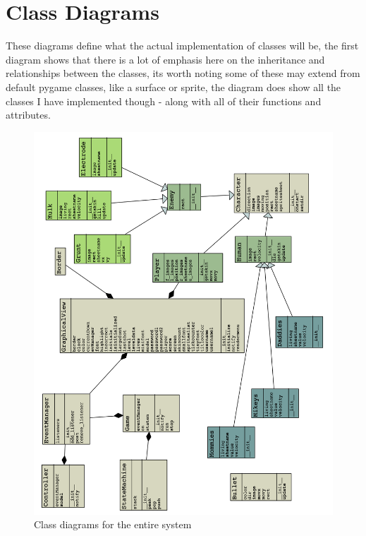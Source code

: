 \section{Class Diagrams}
These diagrams define what the actual implementation of classes will be, the first diagram shows that there is a lot of emphasis here on the inheritance and relationships between the classes, its worth noting some of these may extend from default pygame classes, like a surface or sprite, the diagram does show all the classes I have implemented though - along with all of their functions and attributes. 
\begin{figure}[H]
  \includegraphics[width=1\linewidth]{Figures/overallclassdiagram.png}
  \centering
  \caption{Class diagrams for the entire system}
  \label{fig:Class_Diagram_MAIN}
\end{figure}

